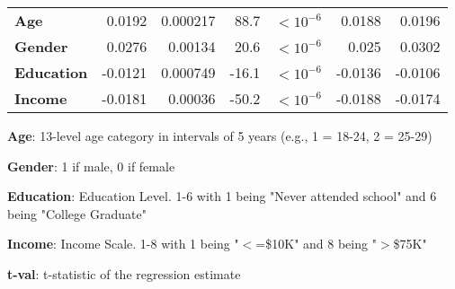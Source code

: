 \documentclass[11pt]{article}
\begin{document}
\begin{table}[h]
\begin{threeparttable}
{\begin{tabular}{lrrrlrr}
\textbf{Age} & \raisebox{2ex}{\hypertarget{D7a}{}}0.0192 & \raisebox{2ex}{\hypertarget{D7b}{}}0.000217 & \raisebox{2ex}{\hypertarget{D7c}{}}88.7 & $<$\raisebox{2ex}{\hypertarget{D7d}{}}$10^{-6}$ & \raisebox{2ex}{\hypertarget{D7e}{}}0.0188 & \raisebox{2ex}{\hypertarget{D7f}{}}0.0196 \\
\textbf{Gender} & \raisebox{2ex}{\hypertarget{D8a}{}}0.0276 & \raisebox{2ex}{\hypertarget{D8b}{}}0.00134 & \raisebox{2ex}{\hypertarget{D8c}{}}20.6 & $<$\raisebox{2ex}{\hypertarget{D8d}{}}$10^{-6}$ & \raisebox{2ex}{\hypertarget{D8e}{}}0.025 & \raisebox{2ex}{\hypertarget{D8f}{}}0.0302 \\
\textbf{Education} & \raisebox{2ex}{\hypertarget{D9a}{}}-0.0121 & \raisebox{2ex}{\hypertarget{D9b}{}}0.000749 & \raisebox{2ex}{\hypertarget{D9c}{}}-16.1 & $<$\raisebox{2ex}{\hypertarget{D9d}{}}$10^{-6}$ & \raisebox{2ex}{\hypertarget{D9e}{}}-0.0136 & \raisebox{2ex}{\hypertarget{D9f}{}}-0.0106 \\
\textbf{Income} & \raisebox{2ex}{\hypertarget{D10a}{}}-0.0181 & \raisebox{2ex}{\hypertarget{D10b}{}}0.00036 & \raisebox{2ex}{\hypertarget{D10c}{}}-50.2 & $<$\raisebox{2ex}{\hypertarget{D10d}{}}$10^{-6}$ & \raisebox{2ex}{\hypertarget{D10e}{}}-0.0188 & \raisebox{2ex}{\hypertarget{D10f}{}}-0.0174 \\
\bottomrule
\end{tabular}}
\begin{tablenotes}
\footnotesize
\item \textbf{Age}: 13-level age category in intervals of 5 years (e.g., 1 = 18-24, 2 = 25-29)
\item \textbf{Gender}: 1 if male, 0 if female
\item \textbf{Education}: Education Level. 1-6 with 1 being "Never attended school" and 6 being "College Graduate"
\item \textbf{Income}: Income Scale. 1-8 with 1 being "$<$=\$10K" and 8 being "$>$\$75K"
\item \textbf{t-val}: t-statistic of the regression estimate

\end{tablenotes}
\end{threeparttable}
\end{table}
\end{document}

